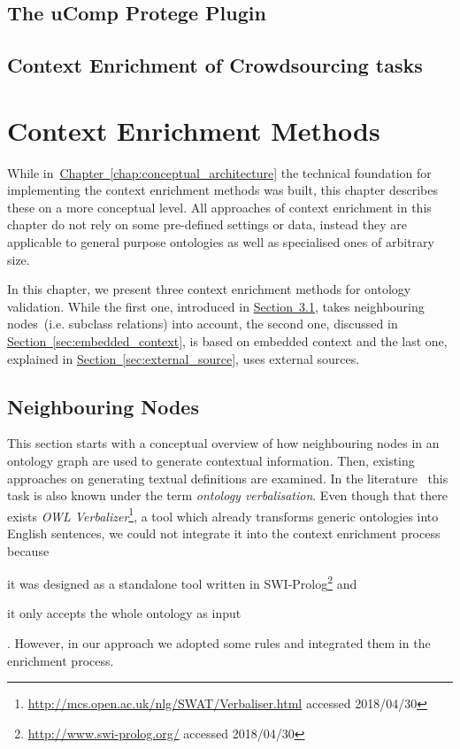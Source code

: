 \documentclass[draft,final]{vutinfth} %
\begin{document}
\section{The uComp Protege Plugin}\label{sec:ucomp_protege_plugin}
\section{Context Enrichment of Crowdsourcing tasks}



\chapter{Context Enrichment Methods}\label{chap:context_enrichment_methods}
While in~\hyperref[chap:conceptual_architecture]{Chapter~\ref*{chap:conceptual_architecture}} the technical foundation for implementing the context enrichment methods was built, this chapter describes these on a more conceptual level. All approaches of context enrichment in this chapter do not rely on some pre-defined settings or data, instead they are applicable to general purpose ontologies as well as specialised ones of arbitrary size.

In this chapter, we present three context enrichment methods for ontology validation. While the first one, introduced in \hyperref[sec:neighboring_nodes]{Section~\ref*{sec:neighboring_nodes}}, takes neighbouring nodes~(i.e. subclass relations) into account, the second one, discussed in \hyperref[sec:embedded_context]{Section~\ref*{sec:embedded_context}}, is based on embedded context and the last one, explained in \hyperref[sec:external_source]{Section~\ref*{sec:external_source}}, uses external sources. 

\section{Neighbouring Nodes}\label{sec:neighboring_nodes}
This section starts with a conceptual overview of how neighbouring nodes in an ontology graph are used to generate contextual information. Then, existing approaches on generating textual definitions are examined. In the literature~\cite{soton265735} this task is also known under the term \textit{ontology verbalisation}. Even though that there exists \textit{OWL Verbalizer}\footnote{\url{http://mcs.open.ac.uk/nlg/SWAT/Verbaliser.html} accessed 2018/04/30}, a tool which already transforms generic ontologies into English sentences, we could not integrate it into the context enrichment process because 
\begin{inparaenum}[a)]
		\item it was designed as a standalone tool written in SWI-Prolog\footnote{\url{http://www.swi-prolog.org/} accessed 2018/04/30} and
		\item it only accepts the whole ontology as input
\end{inparaenum}.
However, in our approach we adopted some rules and integrated them in the enrichment process.
\end{document}
